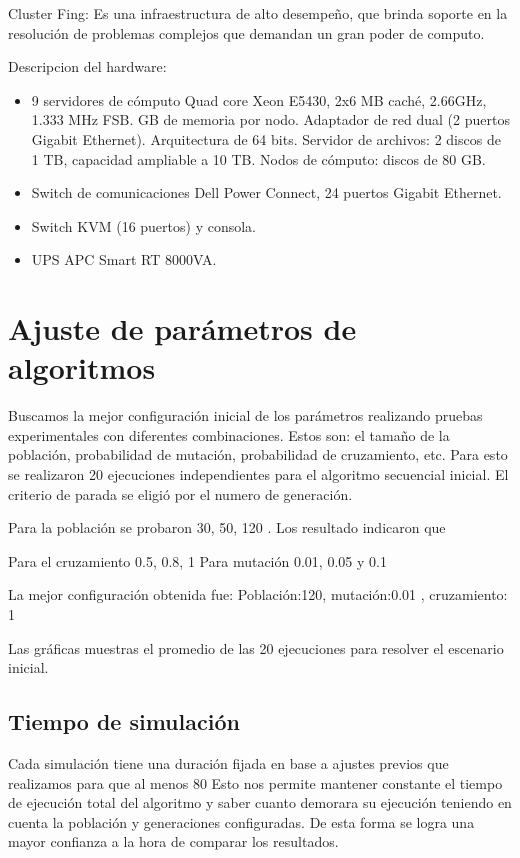 Cluster Fing: Es una infraestructura de alto desempeño, que brinda soporte en la resolución de problemas complejos que demandan un gran poder de computo.

Descripcion del hardware: 
\begin{itemize}
	\item 9 servidores de cómputo
	\subitem Quad core Xeon E5430, 2x6 MB caché, 2.66GHz, 1.333 MHz FSB.
	 GB de memoria por nodo.
	\subitem Adaptador de red dual (2 puertos Gigabit Ethernet).
	\subitem  Arquitectura de 64 bits.
	\subitem Servidor de archivos: 2 discos de 1 TB, capacidad ampliable a 10 TB.
	\subitem Nodos de cómputo: discos de 80 GB.
	\item Switch de comunicaciones
	\subitem Dell Power Connect, 24 puertos Gigabit Ethernet.
	\item Switch KVM (16 puertos) y consola.
	\item UPS APC Smart RT 8000VA.
\end{itemize}

\section{Ajuste de parámetros de algoritmos}
Buscamos la mejor configuración inicial de los parámetros realizando pruebas experimentales con diferentes combinaciones.  Estos son: el tamaño de la población,  probabilidad de mutación, probabilidad de cruzamiento, etc.
Para esto se realizaron 20 ejecuciones independientes para el algoritmo secuencial inicial.
El criterio de parada se eligió por el numero de generación.

Para la población se probaron 30, 50, 120 . Los resultado indicaron que 

Para el cruzamiento 0.5, 0.8, 1
Para mutación 0.01, 0.05 y 0.1

La mejor  configuración obtenida fue:
Población:120, mutación:0.01 , cruzamiento: 1

Las gráficas muestras el promedio de las 20 ejecuciones para resolver el escenario inicial.


\subsection{Tiempo de simulación}

Cada simulación tiene una duración fijada en base a ajustes previos que realizamos para que al menos 80 %
Esto nos permite mantener constante el tiempo de ejecución total del algoritmo y saber cuanto demorara su ejecución teniendo en cuenta la población y generaciones configuradas. De esta forma se logra una mayor confianza a la hora de comparar los resultados.



